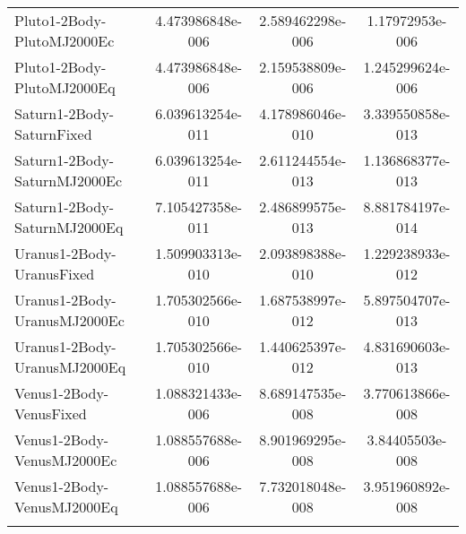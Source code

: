 \begin{table}[htbp!]
\begin{tabular}{lccc}
         Pluto1-2Body-PlutoMJ2000Ec & 4.473986848e-006 & 2.589462298e-006 & 1.17972953e-006 \\
         Pluto1-2Body-PlutoMJ2000Eq & 4.473986848e-006 & 2.159538809e-006 & 1.245299624e-006 \\
         Saturn1-2Body-SaturnFixed & 6.039613254e-011 & 4.178986046e-010 & 3.339550858e-013 \\
         Saturn1-2Body-SaturnMJ2000Ec & 6.039613254e-011 & 2.611244554e-013 & 1.136868377e-013 \\
         Saturn1-2Body-SaturnMJ2000Eq & 7.105427358e-011 & 2.486899575e-013 & 8.881784197e-014 \\
         Uranus1-2Body-UranusFixed & 1.509903313e-010 & 2.093898388e-010 & 1.229238933e-012 \\
         Uranus1-2Body-UranusMJ2000Ec & 1.705302566e-010 & 1.687538997e-012 & 5.897504707e-013 \\
         Uranus1-2Body-UranusMJ2000Eq & 1.705302566e-010 & 1.440625397e-012 & 4.831690603e-013 \\
         Venus1-2Body-VenusFixed & 1.088321433e-006 & 8.689147535e-008 & 3.770613866e-008 \\
         Venus1-2Body-VenusMJ2000Ec & 1.088557688e-006 & 8.901969295e-008 & 3.84405503e-008 \\
         Venus1-2Body-VenusMJ2000Eq & 1.088557688e-006 & 7.732018048e-008 & 3.951960892e-008 \\
      \hline\hline
      \label{Table: LinuxGMAT-MacGMAT CS Parameters Set 4} 
\end{tabular}
\end{table}

